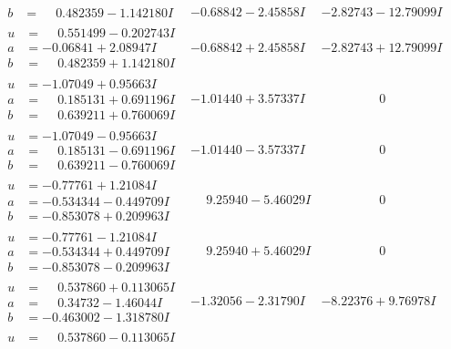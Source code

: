 \documentclass[1p]{elsarticle_modified}
\theoremstyle{definition}
\begin{document}
$$\begin{array}{c|c|c}
\begin{aligned}
b &= \phantom{-}0.482359 - 1.142180 I\end{aligned}
 & -0.68842 - 2.45858 I & -2.82743 - 12.79099 I \\ \hline\begin{aligned}
u &= \phantom{-}0.551499 - 0.202743 I \\
a &= -0.06841 + 2.08947 I \\
b &= \phantom{-}0.482359 + 1.142180 I\end{aligned}
 & -0.68842 + 2.45858 I & -2.82743 + 12.79099 I \\ \hline\begin{aligned}
u &= -1.07049 + 0.95663 I \\
a &= \phantom{-}0.185131 + 0.691196 I \\
b &= \phantom{-}0.639211 + 0.760069 I\end{aligned}
 & -1.01440 + 3.57337 I & \phantom{-0.000000 } 0 \\ \hline\begin{aligned}
u &= -1.07049 - 0.95663 I \\
a &= \phantom{-}0.185131 - 0.691196 I \\
b &= \phantom{-}0.639211 - 0.760069 I\end{aligned}
 & -1.01440 - 3.57337 I & \phantom{-0.000000 } 0 \\ \hline\begin{aligned}
u &= -0.77761 + 1.21084 I \\
a &= -0.534344 - 0.449709 I \\
b &= -0.853078 + 0.209963 I\end{aligned}
 & \phantom{-}9.25940 - 5.46029 I & \phantom{-0.000000 } 0 \\ \hline\begin{aligned}
u &= -0.77761 - 1.21084 I \\
a &= -0.534344 + 0.449709 I \\
b &= -0.853078 - 0.209963 I\end{aligned}
 & \phantom{-}9.25940 + 5.46029 I & \phantom{-0.000000 } 0 \\ \hline\begin{aligned}
u &= \phantom{-}0.537860 + 0.113065 I \\
a &= \phantom{-}0.34732 - 1.46044 I \\
b &= -0.463002 - 1.318780 I\end{aligned}
 & -1.32056 - 2.31790 I & -8.22376 + 9.76978 I \\ \hline\begin{aligned}
u &= \phantom{-}0.537860 - 0.113065 I \\

\end{aligned}
\end{array}$$
\end{document}
